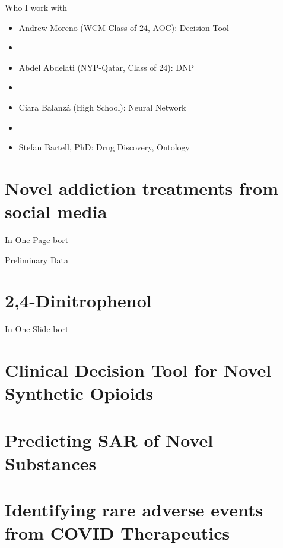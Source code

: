 \begin{frame}{Who I work with}
\addtolength{\leftmargini}{\labelsep}
\begin{itemize}
	\item[] Andrew Moreno (WCM Class of 24, AOC): Decision Tool
	\item[]
	\item[] Abdel Abdelati (NYP-Qatar, Class of 24): DNP
	\item[] 
	\item[] Ciara Balanz\'{a} (High School): Neural Network
	\item[] 
	\item[] Stefan Bartell, PhD: Drug Discovery, Ontology
\end{itemize}

\end{frame}

\section[Drug Discovery]{Novel addiction treatments from social media}

\begin{frame}{In One Page}
bort
\end{frame}

\begin{frame}{Preliminary Data}

\end{frame}

\section{2,4-Dinitrophenol}

\begin{frame}{In One Slide}
bort 
\end{frame}

\section[Decision Tool]{Clinical Decision Tool for Novel Synthetic Opioids}

\section[Neural Network]{Predicting SAR of Novel Substances}

\section[COVID Tox]{Identifying rare adverse events from COVID Therapeutics}


